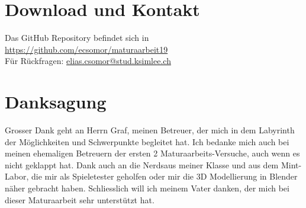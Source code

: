 \section{Download und Kontakt}

Das GitHub Repository befindet sich in\\
\url{https://github.com/ecsomor/maturaarbeit19}\\
Für Rückfragen: \href{mailto:elias.csomor@stud.ksimlee.ch}{elias.csomor@stud.ksimlee.ch}

\section{Danksagung}
Grosser Dank geht an Herrn Graf, meinen Betreuer, der mich in dem Labyrinth der Möglichkeiten und Schwerpunkte begleitet hat.
Ich bedanke mich auch bei meinen ehemaligen Betreuern der ersten 2 Maturaarbeits-Versuche, auch wenn es nicht geklappt hat.
Dank auch an die \glqq Nerds\grqq aus meiner Klasse und aus dem Mint-Labor, die mir als Spieletester geholfen oder mir die 3D Modellierung in Blender näher gebracht haben.
Schliesslich will ich meinem Vater danken, der mich bei dieser Maturaarbeit sehr unterstützt hat.